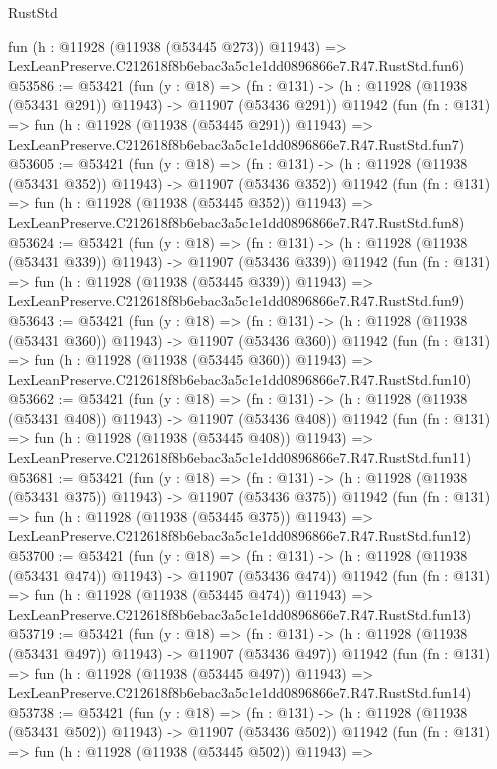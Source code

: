\begin{lexlean}{RustStd}
\begin{coremodule}
    fun (h : @11928 (@11938 (@53445 @273)) @11943) =>
    LexLeanPreserve.C212618f8b6ebac3a5c1e1dd0896866e7.R47.RustStd.fun6)
@53586 := @53421
    (fun (y : @18) =>
    (fn : @131) -> (h : @11928 (@11938 (@53431 @291)) @11943) -> @11907 (@53436 @291))
    @11942
    (fun (fn : @131) =>
    fun (h : @11928 (@11938 (@53445 @291)) @11943) =>
    LexLeanPreserve.C212618f8b6ebac3a5c1e1dd0896866e7.R47.RustStd.fun7)
@53605 := @53421
    (fun (y : @18) =>
    (fn : @131) -> (h : @11928 (@11938 (@53431 @352)) @11943) -> @11907 (@53436 @352))
    @11942
    (fun (fn : @131) =>
    fun (h : @11928 (@11938 (@53445 @352)) @11943) =>
    LexLeanPreserve.C212618f8b6ebac3a5c1e1dd0896866e7.R47.RustStd.fun8)
@53624 := @53421
    (fun (y : @18) =>
    (fn : @131) -> (h : @11928 (@11938 (@53431 @339)) @11943) -> @11907 (@53436 @339))
    @11942
    (fun (fn : @131) =>
    fun (h : @11928 (@11938 (@53445 @339)) @11943) =>
    LexLeanPreserve.C212618f8b6ebac3a5c1e1dd0896866e7.R47.RustStd.fun9)
@53643 := @53421
    (fun (y : @18) =>
    (fn : @131) -> (h : @11928 (@11938 (@53431 @360)) @11943) -> @11907 (@53436 @360))
    @11942
    (fun (fn : @131) =>
    fun (h : @11928 (@11938 (@53445 @360)) @11943) =>
    LexLeanPreserve.C212618f8b6ebac3a5c1e1dd0896866e7.R47.RustStd.fun10)
@53662 := @53421
    (fun (y : @18) =>
    (fn : @131) -> (h : @11928 (@11938 (@53431 @408)) @11943) -> @11907 (@53436 @408))
    @11942
    (fun (fn : @131) =>
    fun (h : @11928 (@11938 (@53445 @408)) @11943) =>
    LexLeanPreserve.C212618f8b6ebac3a5c1e1dd0896866e7.R47.RustStd.fun11)
@53681 := @53421
    (fun (y : @18) =>
    (fn : @131) -> (h : @11928 (@11938 (@53431 @375)) @11943) -> @11907 (@53436 @375))
    @11942
    (fun (fn : @131) =>
    fun (h : @11928 (@11938 (@53445 @375)) @11943) =>
    LexLeanPreserve.C212618f8b6ebac3a5c1e1dd0896866e7.R47.RustStd.fun12)
@53700 := @53421
    (fun (y : @18) =>
    (fn : @131) -> (h : @11928 (@11938 (@53431 @474)) @11943) -> @11907 (@53436 @474))
    @11942
    (fun (fn : @131) =>
    fun (h : @11928 (@11938 (@53445 @474)) @11943) =>
    LexLeanPreserve.C212618f8b6ebac3a5c1e1dd0896866e7.R47.RustStd.fun13)
@53719 := @53421
    (fun (y : @18) =>
    (fn : @131) -> (h : @11928 (@11938 (@53431 @497)) @11943) -> @11907 (@53436 @497))
    @11942
    (fun (fn : @131) =>
    fun (h : @11928 (@11938 (@53445 @497)) @11943) =>
    LexLeanPreserve.C212618f8b6ebac3a5c1e1dd0896866e7.R47.RustStd.fun14)
@53738 := @53421
    (fun (y : @18) =>
    (fn : @131) -> (h : @11928 (@11938 (@53431 @502)) @11943) -> @11907 (@53436 @502))
    @11942
    (fun (fn : @131) =>
    fun (h : @11928 (@11938 (@53445 @502)) @11943) =>

\end{coremodule}
\end{lexlean}
